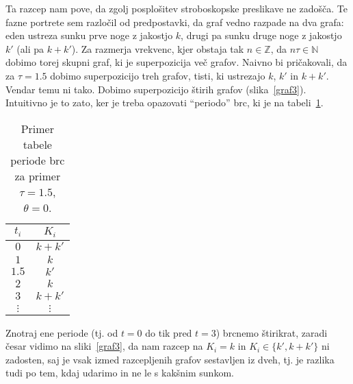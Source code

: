 \documentclass[a4paper, 12pt]{article}
\begin{document}
Ta razcep nam pove, da zgolj posplo\v sitev stroboskopske preslikave ne zado\v s\v ca. Te fazne portrete sem razlo\v cil
od predpostavki, da graf vedno razpade na dva grafa: eden ustreza sunku prve noge z jakostjo $k$, drugi pa sunku druge
noge z jakostjo $k'$ (ali pa $k + k'$). Za razmerja vrekvenc, kjer obstaja tak $n \in \mathbb{Z}$, da
$n \tau \in \mathbb{N}$ dobimo torej skupni graf, ki je superpozicija  ve\v c grafov. Naivno bi pri\v cakovali, da za
$\tau = 1.5$ dobimo superpozicijo treh grafov, tisti, ki ustrezajo $k$, $k'$ in $k + k'$. Vendar temu ni tako. Dobimo
superpozicijo \v stirih grafov (slika~\ref{graf3}). Intuitivno je to zato, ker je treba opazovati "`periodo"' brc, ki
je na tabeli~\ref{tab1}.
\begin{table}[H]\centering
	\caption{Primer tabele periode brc za primer $\tau = 1.5$, $\theta = 0$.}
	\begin{tabular}{c | c}
		$t_i$ & $K_i$ \\ \hline\hline
		$0$ & $k + k'$ \\
		$1$ & $k$ \\
		$1.5$ & $k'$ \\
		$2$ & $k$ \\ \hline
		$3$ & $k + k'$\\
		$\vdots$ & $\vdots$
	\end{tabular}
	\label{tab1}
\end{table}
Znotraj ene periode (tj. od $t = 0$ do tik pred $t = 3$) brcnemo \v stirikrat, zaradi \v cesar vidimo na sliki~\ref{graf3},
da nam razcep na $K_i = k$ in $K_i \in \{k', k + k'\}$ ni zadosten, saj je vsak izmed razcepljenih grafov sestavljen iz dveh,
tj. je razlika tudi po tem, kdaj udarimo in ne le s kak\v snim sunkom.
\end{document}
